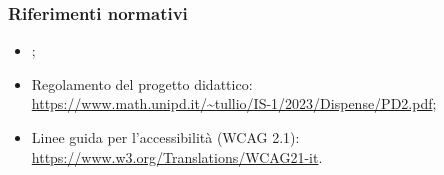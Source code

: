 \subsubsection{Riferimenti normativi}
\begin{itemize}
  \item \NormeDiProgetto;
  \item Regolamento del progetto didattico:\\ \href{https://www.math.unipd.it/~tullio/IS-1/2023/Dispense/PD2.pdf}{https://www.math.unipd.it/\textasciitilde tullio/IS-1/2023/Dispense/PD2.pdf};
  \item Linee guida per l'accessibilità (WCAG 2.1):\\ \href{https://www.w3.org/Translations/WCAG21-it}{https://www.w3.org/Translations/WCAG21-it}.
\end{itemize}

